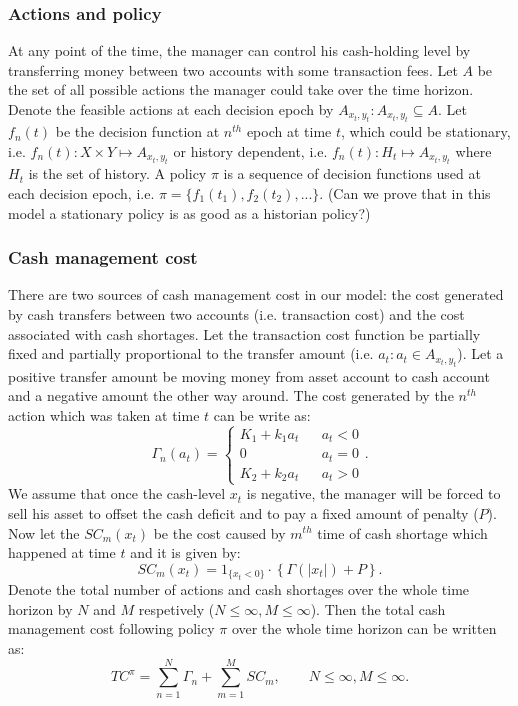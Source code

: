 \documentclass[12pt]{article}
\begin{document}
\subsubsection{Actions and policy}
At any point of the time, the manager can control his cash-holding level by transferring money between two accounts with some transaction fees. Let $A$ be the set of all possible actions the manager could take over the time horizon. Denote the feasible actions at each decision epoch by $A_{x_t, y_t}: A_{x_t, y_t} \subseteq A$. Let $f_n(t)$ be the decision function at $n^{th}$ epoch at time $t$, which could be stationary, i.e. $f_n(t): X \times Y \mapsto  A_{x_t, y_t}$ or history dependent, i.e. $f_n(t): H_t \mapsto  A_{x_t, y_t}$ where $H_t$ is the set of history. A policy $\pi$ is a sequence of decision functions used at each decision epoch, i.e. $\pi = \{f_1(t_1), f_2(t_2),... \}$. {\color{red}(Can we prove that in this model a stationary policy is as good as a historian policy?)}

\subsubsection{Cash management cost}
There are two sources of cash management cost in our model: the cost generated by cash transfers between two accounts (i.e. transaction cost) and the cost associated with cash shortages.
Let the transaction cost function be partially fixed and partially proportional to the transfer amount (i.e. $a_t:a_t \in A_{x_t, y_t}$). Let a positive transfer amount be moving money from asset account to cash account and a negative amount the other way around. The cost generated by the $n^{th}$ action which was taken at time $t$ can be write as: 
$$ \Gamma_n(a_t)=\left\{
\begin{array}{rcl}
 K_1 + k_1 a_t       &      & {a_t < 0}\\
0     &      & {a_t = 0}\\
 K_2 + k_2 a_t       &      & {a_t > 0}
\end{array} \right. .$$ We assume that once the cash-level $x_t$ is negative, the manager will be forced to sell his asset to offset the cash deficit and to pay a fixed amount of penalty ($P$). Now let the $SC_m(x_t)$ be the cost caused by $m^{th}$ time of cash shortage which happened at time $t$ and it is given by: $$SC_m(x_t)= 1_{\{x_t < 0\}} \cdot \left\{ \Gamma(|x_t|) + P\right\}.$$ Denote the total number of actions and cash shortages over the whole time horizon by $N$ and $M$ respetively ($N \leq \infty, M \leq \infty$). Then the total cash management cost following policy $\pi$ over the whole time horizon can be written as: $$ TC^{\pi} = \sum^N_{n=1} \Gamma_n  +  \sum^M_{m=1} SC_m, \qquad N\leq\infty,M\leq\infty.$$
\end{document}
